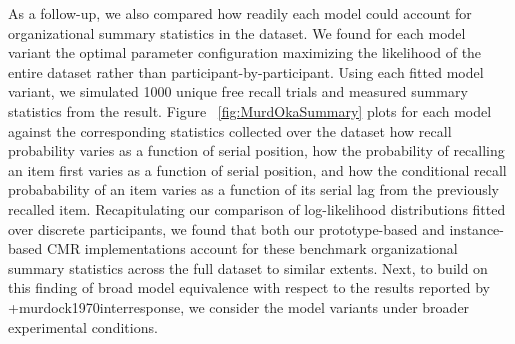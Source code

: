 {}As a follow-up, we also compared how readily each model could account for organizational summary statistics in the dataset. We found for each model variant the optimal parameter configuration maximizing the likelihood of the entire dataset rather than participant-by-participant. Using each fitted model variant, we simulated 1000 unique free recall trials and measured summary statistics from the result. Figure ~\ref{fig:MurdOkaSummary} plots for each model against the corresponding statistics collected over the dataset how recall probability varies as a function of serial position, how the probability of recalling an item first varies as a function of serial position, and how the conditional recall probabability of an item varies as a function of its serial lag from the previously recalled item. Recapitulating our comparison of log-likelihood distributions fitted over discrete participants, we found that both our prototype-based and instance-based CMR implementations account for these benchmark organizational summary statistics across the full dataset to similar extents. Next, to build on this finding of broad model equivalence with respect to the results reported by +{}{}{murdock1970interresponse}, we consider the model variants under broader experimental conditions.\relax